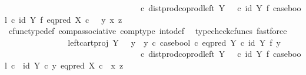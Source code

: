\begin{isabellebody}
\ \ \ \ \ \ \ \ \ \ \ \ \ \ \ \ \ \ \ \ \ \ \ \ \ \ \ \ \ \ \ \ \ {\isasymcirc}\isactrlsub c\ dist{\isacharunderscore}{\kern0pt}prod{\isacharunderscore}{\kern0pt}coprod{\isacharunderscore}{\kern0pt}left\ Y\ {\isasymone}\ {\isasymone}\ {\isasymcirc}\isactrlsub c\ {\isacharparenleft}{\kern0pt}id\ Y\ {\isasymtimes}\isactrlsub f\ case{\isacharunderscore}{\kern0pt}bool{\isacharparenright}{\kern0pt}\ {\isasymcirc}\isactrlsub c\ {\isacharparenleft}{\kern0pt}id\ Y\ {\isasymtimes}\isactrlsub f\ eq{\isacharunderscore}{\kern0pt}pred\ X{\isacharparenright}{\kern0pt}\ {\isasymcirc}\isactrlsub c\ \ \ {\isasymlangle}y{\isacharcomma}{\kern0pt}\ {\isasymlangle}x{\isacharcomma}{\kern0pt}\ z{\isasymrangle}{\isasymrangle}{\isachardoublequoteclose}\isanewline
\ \ \ \ \ \ \ \ \ \ \ \ \isamarkupfalse%
\ cfunc{\isacharunderscore}{\kern0pt}type{\isacharunderscore}{\kern0pt}def\ comp{\isacharunderscore}{\kern0pt}associative\ comp{\isacharunderscore}{\kern0pt}type\ into{\isacharunderscore}{\kern0pt}def\ \isamarkupfalse%
\ {\isacharparenleft}{\kern0pt}typecheck{\isacharunderscore}{\kern0pt}cfuncs{\isacharcomma}{\kern0pt}\ fastforce{\isacharparenright}{\kern0pt}\isanewline
\ \ \ \ \ \ \ \ \ \ \isamarkupfalse%
\ \isamarkupfalse%
\ {\isachardoublequoteopen}{\isachardot}{\kern0pt}{\isachardot}{\kern0pt}{\isachardot}{\kern0pt}\ {\isacharequal}{\kern0pt}\ {\isacharparenleft}{\kern0pt}left{\isacharunderscore}{\kern0pt}cart{\isacharunderscore}{\kern0pt}proj\ Y\ {\isasymone}\ {\isasymamalg}\ {\isacharparenleft}{\kern0pt}{\isacharparenleft}{\kern0pt}y{}\ {\isasymamalg}\ y{}{\isacharparenright}{\kern0pt}\ {\isasymcirc}\isactrlsub c\ case{\isacharunderscore}{\kern0pt}bool\ {\isasymcirc}\isactrlsub c\ eq{\isacharunderscore}{\kern0pt}pred\ Y\ {\isasymcirc}\isactrlsub c\ {\isacharparenleft}{\kern0pt}id\ Y\ {\isasymtimes}\isactrlsub f\ y{}{\isacharparenright}{\kern0pt}{\isacharparenright}{\kern0pt}{\isacharparenright}{\kern0pt}\isanewline
\ \ \ \ \ \ \ \ \ \ \ \ \ \ \ \ \ \ \ \ \ \ \ \ \ \ \ \ \ \ \ \ \ {\isasymcirc}\isactrlsub c\ dist{\isacharunderscore}{\kern0pt}prod{\isacharunderscore}{\kern0pt}coprod{\isacharunderscore}{\kern0pt}left\ Y\ {\isasymone}\ {\isasymone}\ {\isasymcirc}\isactrlsub c\ {\isacharparenleft}{\kern0pt}id\ Y\ {\isasymtimes}\isactrlsub f\ case{\isacharunderscore}{\kern0pt}bool{\isacharparenright}{\kern0pt}\ {\isasymcirc}\isactrlsub c\ \ {\isasymlangle}id\ Y\ {\isasymcirc}\isactrlsub c\ y{\isacharcomma}{\kern0pt}\ eq{\isacharunderscore}{\kern0pt}pred\ X\ {\isasymcirc}\isactrlsub c\ \ {\isasymlangle}x{\isacharcomma}{\kern0pt}\ z{\isasymrangle}{\isasymrangle}{\isachardoublequoteclose}\isanewline

\end{isabellebody}
